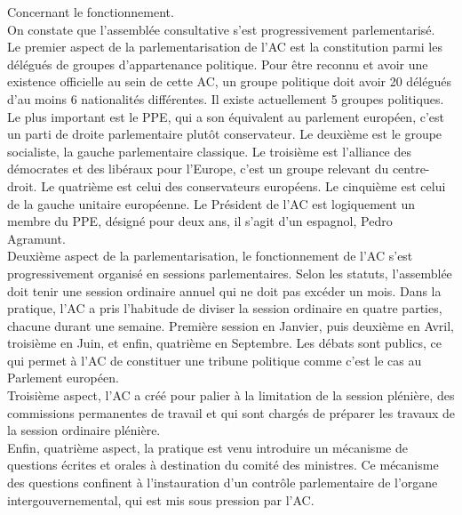 \documentclass[10pt, a4paper, openany]{book}
\begin{document}
Concernant le fonctionnement. \\
On constate que l'assemblée consultative s'est progressivement parlementarisé. \\
Le premier aspect de la parlementarisation de l'AC est la constitution parmi les délégués de groupes d'appartenance politique. Pour être reconnu et avoir une existence officielle au sein de cette AC, un groupe politique doit avoir 20 délégués d'au moins 6 nationalités différentes. Il existe actuellement 5 groupes politiques. Le plus important est le PPE, qui a son équivalent au parlement européen, c'est un parti de droite parlementaire plutôt conservateur. Le deuxième est le groupe socialiste, la gauche parlementaire classique. Le troisième est l'alliance des démocrates et des libéraux pour l'Europe, c'est un groupe relevant du centre-droit. Le quatrième est celui des conservateurs européens. Le cinquième est celui de la gauche unitaire européenne. Le Président de l'AC est logiquement un membre du PPE, désigné pour deux ans, il s'agit d'un espagnol, Pedro Agramunt. \\
Deuxième aspect de la parlementarisation, le fonctionnement de l'AC s'est progressivement organisé en sessions parlementaires. Selon les statuts, l'assemblée doit tenir une session ordinaire annuel qui ne doit pas excéder un mois. Dans la pratique, l'AC a pris l'habitude de diviser la session ordinaire en quatre parties, chacune durant une semaine. Première session en Janvier, puis deuxième en Avril, troisième en Juin, et enfin, quatrième en Septembre. Les débats sont publics, ce qui permet à l'AC de constituer une tribune politique comme c'est le cas au Parlement européen. \\
Troisième aspect, l'AC a créé pour palier à la limitation de la session plénière, des commissions permanentes de travail et qui sont chargés de préparer les travaux de la session ordinaire plénière. \\
Enfin, quatrième aspect, la pratique est venu introduire un mécanisme de questions écrites et orales à destination du comité des ministres. Ce mécanisme des questions confinent à l'instauration d'un contrôle parlementaire de l'organe intergouvernemental, qui est mis sous pression par l'AC. 
\end{document}
